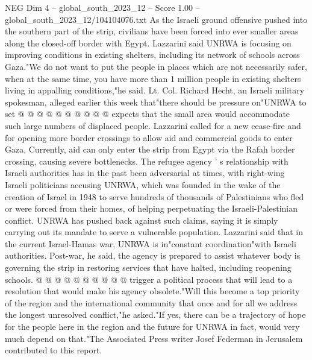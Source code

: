 \begin{textsample}{NEG Dim 4 – global\_south\_2023\_12 – Score 1.00 – global\_south\_2023\_12/104104076.txt}
As the Israeli ground offensive pushed into the southern part of the strip, civilians have been forced into ever smaller areas along the closed-off border with Egypt.
Lazzarini said UNRWA is focusing on improving conditions in existing shelters, including its network of schools across Gaza."We do not want to put the people in places which are not necessarily safer, when at the same time, you have more than 1 million people in existing shelters living in appalling conditions,"he said.
Lt.
Col.
Richard Hecht, an Israeli military spokesman, alleged earlier this week that"there should be pressure on"UNRWA to set @ @ @ @ @ @ @ @ @ @ expects that the small area would accommodate such large numbers of displaced people.
Lazzarini called for a new cease-fire and for opening more border crossings to allow aid and commercial goods to enter Gaza.
Currently, aid can only enter the strip from Egypt via the Rafah border crossing, causing severe bottlenecks.
The refugee agency ' s relationship with Israeli authorities has in the past been adversarial at times, with right-wing Israeli politicians accusing UNRWA, which was founded in the wake of the creation of Israel in 1948 to serve hundreds of thousands of Palestinians who fled or were forced from their homes, of helping perpetuating the Israeli-Palestinian conflict.
UNRWA has pushed back against such claims, saying it is simply carrying out its mandate to serve a vulnerable population.
Lazzarini said that in the current Israel-Hamas war, UNRWA is in"constant coordination"with Israeli authorities.
Post-war, he said, the agency is prepared to assist whatever body is governing the strip in restoring services that have halted, including reopening schools. @ @ @ @ @ @ @ @ @ @ trigger a political process that will lead to a resolution that would make his agency obsolete."Will this become a top priority of the region and the international community that once and for all we address the longest unresolved conflict,"he asked."If yes, there can be a trajectory of hope for the people here in the region and the future for UNRWA in fact, would very much depend on that."The Associated Press writer Josef Federman in Jerusalem contributed to this report.

\end{textsample}
